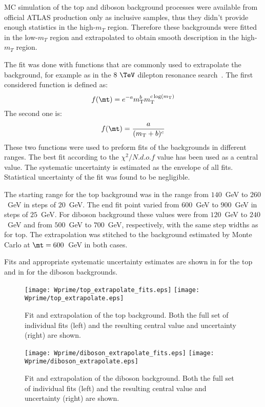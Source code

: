 MC simulation of the top and diboson background processes were available from official ATLAS production only as inclusive samples,
thus they didn't provide enough statistics in the high-$m_T$ region.
Therefore these backgrounds were fitted in the low-$m_T$ region and extrapolated to obtain smooth description in the high-$m_T$ region.

The fit was done with functions that are commonly used to extrapolate the background, for example as in the $8~\TeV$ dilepton resonance search~\cite{Aad:2014cka}.
The first considered function is defined as:
\begin{equation}
 f(\mt) = e^{-a} m_\mathrm{T}^{b} m_\mathrm{T}^{c \log(m_\mathrm{T})}
  \label{eq:dijetfunc}
\end{equation}
The second one is:
\begin{equation}
 f(\mt) = \frac{a}{(m_\mathrm{T}+b)^{c}}
  \label{eq:powerlaw}
\end{equation}
These two functions were used to preform fits of the backgrounds in different ranges. 
The best fit according to the $\chi^{2}/N.d.o.f$ value has been used as a central value.
The systematic uncertainty is estimated as the envelope of all fits.
Statistical uncertainty of the fit was found to be negligible.

The starting range for the top background was in the range from $140$~GeV to $260$~GeV in steps of $20$~GeV. The end fit point varied from $600$~GeV to $900$~GeV in steps of $25$~GeV.
For diboson background these values were from $120$~GeV to $240$~GeV and from $500$~GeV to $700$~GeV, respectively, with the same step widths as for top.
The extrapolation was stitched to the background estimated by Monte Carlo at $\mt=600$~GeV in both cases.

Fits and appropriate systematic uncertainty estimates are shown in 
 for the top and in  for the diboson backgrounds.
\begin{figure}[!htb]
  \centering
  \texttt{[image: Wprime/top\_extrapolate\_fits.eps]}
  \texttt{[image: Wprime/top\_extrapolate.eps]}
  \caption{Fit and extrapolation of the top background. Both the full set of individual
fits (left) and the resulting central value and uncertainty (right) are shown.}
  \label{fig:mu_extrapolate_top}
\end{figure}
\begin{figure}[!htb]
  \centering
  \texttt{[image: Wprime/diboson\_extrapolate\_fits.eps]}
  \texttt{[image: Wprime/diboson\_extrapolate.eps]}
  \caption{Fit and extrapolation of the diboson background. Both the full set of individual
fits (left) and the resulting central value and uncertainty (right) are shown.}
  \label{fig:mu_extrapolate_diboson}
\end{figure}

